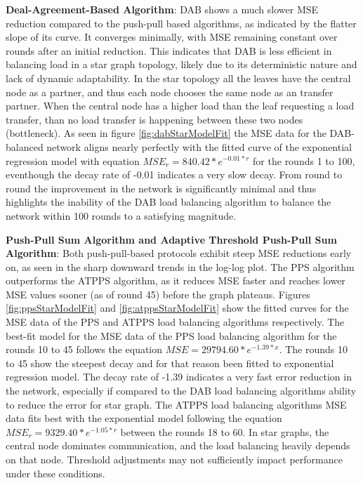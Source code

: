 \textbf{Deal-Agreement-Based Algorithm}: DAB shows a much slower MSE reduction compared to the push-pull based algorithms, as indicated by the flatter slope of its curve. It converges minimally, with MSE remaining constant over rounds after an initial reduction. This indicates that DAB is less efficient in balancing load in a star graph topology, likely due to its deterministic nature and lack of dynamic adaptability. In the star topology all the leaves have the central node as a partner, and thus each node chooses the same node as an transfer partner. When the central node has a higher load than the leaf requesting a load transfer, than no load transfer is happening between these two nodes (bottleneck). As seen in figure \ref{fig:dabStarModelFit} the MSE data for the DAB-balanced network aligns nearly perfectly with the fitted curve of the exponential regression model with equation $MSE_r=840.42*e^{-0.01*r}$ for the rounds 1 to 100, eventhough the decay rate of -0.01 indicates a very slow decay. From round to round the improvement in the network is significantly minimal and thus highlights the inability of the DAB load balancing algorithm to balance the network within 100 rounds to a satisfying magnitude.



\textbf{Push-Pull Sum Algorithm and Adaptive Threshold Push-Pull Sum Algorithm}: Both push-pull-based protocols exhibit steep MSE reductions early on, as seen in the sharp downward trends in the log-log plot. The PPS algorithm outperforms the ATPPS algorithm, as it reduces MSE faster and reaches lower MSE values sooner (as of round 45) before the graph plateaus. Figures \ref{fig:ppsStarModelFit} and \ref{fig:atppsStarModelFit} show the fitted curves for the MSE data of the PPS and ATPPS load balancing algorithms respectively. The best-fit model for the MSE data of the PPS load balancing algorithm for the rounds 10 to 45 follows the equation $MSE=29794.60*e^{-1.39*x}$. The rounds 10 to 45 show the steepest decay and for that reason been fitted to exponential regression model. The decay rate of -1.39 indicates a very fast error reduction in the network, especially if compared to the DAB load balancing algorithms ability to reduce the error for star graph. The ATPPS load balancing algorithms MSE data fits best with the exponential model following the equation $MSE_r=9329.40*e^{-1.05*r}$ between the rounds 18 to 60. In star graphs, the central node dominates communication, and the load balancing heavily depends on that node. Threshold adjustments may not sufficiently impact performance under these conditions.


